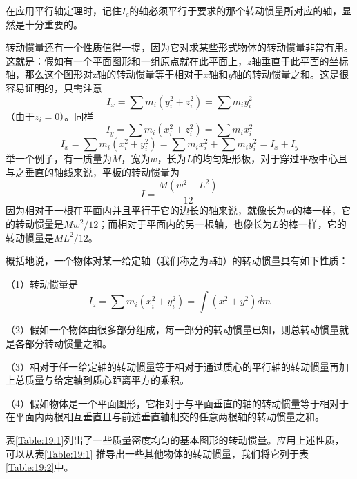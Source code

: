 在应用平行轴定理时，记住$I_c$的轴必须平行于要求的那个转动惯量所对应的轴，显然是十分重要的。

转动惯量还有一个性质值得一提，因为它对求某些形式物体的转动惯量非常有用。这就是：假如有一个平面图形和一组原点就在此平面上，$z$轴垂直于此平面的坐标轴，那么这个图形对z轴的转动惯量等于相对于$x$轴和$y$轴的转动惯量之和。这是很容易证明的，只需注意
\begin{equation*}
    I_x = \sum m_i(y_i^2 + z_i^2) = \sum m_iy_i^2
\end{equation*}
（由于$z_i=0$）。同样
\begin{equation*}
    I_y = \sum m_i(x_i^2 + z_i^2) = \sum m_ix_i^2
\end{equation*}
\begin{equation*}
    I_x = \sum m_i(x_i^2 + y_i^2) = \sum m_ix_i^2 + \sum m_iy_i^2 = I_x + I_y
\end{equation*}
举一个例子，有一质量为$M$，宽为$w$，长为$L$的均匀矩形板，对于穿过平板中心且与之垂直的轴线来说，平板的转动惯量为
\begin{equation*}
    I = \frac{M(w^2+L^2)}{12}
\end{equation*}
因为相对于一根在平面内并且平行于它的边长的轴来说，就像长为$w$的棒一样，它的转动惯量是$Mw^2/12$；而相对于平面内的另一根轴，也像长为$L$的棒一样，它的转动惯量是$ML^2/12$。

概括地说，一个物体对某一给定轴（我们称之为$z$轴）的转动惯量具有如下性质：

（1）转动惯量是
\begin{equation*}
    I_z = \sum m_i(x_i^2 + y_i^2) = \int (x^2+y^2)dm
\end{equation*}

（2）假如一个物体由很多部分组成，每一部分的转动惯量已知，则总转动惯量就是各部分转动惯量之和。

（3）相对于任一给定轴的转动惯量等于相对于通过质心的平行轴的转动惯量再加上总质量与给定轴到质心距离平方的乘积。

（4）假如物体是一个平面图形，它相对于与平面垂直的轴的转动惯量等于相对于在平面内两根相互垂直且与前述垂直轴相交的任意两根轴的转动惯量之和。

表\ref{Table:19:1}列出了一些质量密度均匀的基本图形的转动惯量。应用上述性质，可以从表\ref{Table:19:1} 推导出一些其他物体的转动惯量，我们将它列于表\ref{Table:19:2}中。

\begin{table}[H]
    \footnotesize
    \centering
    \caption{}
    \label{Table:19:1}
\end{table}

